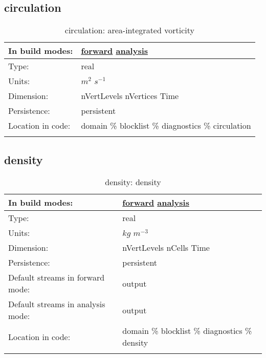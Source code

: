 \subsection[circulation]{circulation}
\label{subsec:var_sec_diagnostics_circulation}
\begin{center}
\begin{longtable}{| p{2.0in} | p{4.0in} |}
        \hline 
        In build modes: & \hyperref[subsec:forward_var_tab_diagnostics]{forward} \hyperref[subsec:analysis_var_tab_diagnostics]{analysis} \\
        \hline 
        Type: & real \\
        \hline 
        Units: & $m^2$ $s^{-1}$ \\
        \hline 
        Dimension: & nVertLevels nVertices Time \\
        \hline 
        Persistence: & persistent \\
        \hline 
		 Location in code: & domain \% blocklist \% diagnostics \% circulation \\
		 \hline 
    \caption{circulation: area-integrated vorticity}
\end{longtable}
\end{center}
\subsection[density]{density}
\label{subsec:var_sec_diagnostics_density}
\begin{center}
\begin{longtable}{| p{2.0in} | p{4.0in} |}
        \hline 
        In build modes: & \hyperref[subsec:forward_var_tab_diagnostics]{forward} \hyperref[subsec:analysis_var_tab_diagnostics]{analysis} \\
        \hline 
        Type: & real \\
        \hline 
        Units: & $kg$ $m^{-3}$ \\
        \hline 
        Dimension: & nVertLevels nCells Time \\
        \hline 
        Persistence: & persistent \\
        \hline 
		 Default streams in forward mode: &  output \\
        \hline 
		 Default streams in analysis mode: &  output \\
        \hline 
		 Location in code: & domain \% blocklist \% diagnostics \% density \\
		 \hline 
    \caption{density: density}
\end{longtable}
\end{center}
